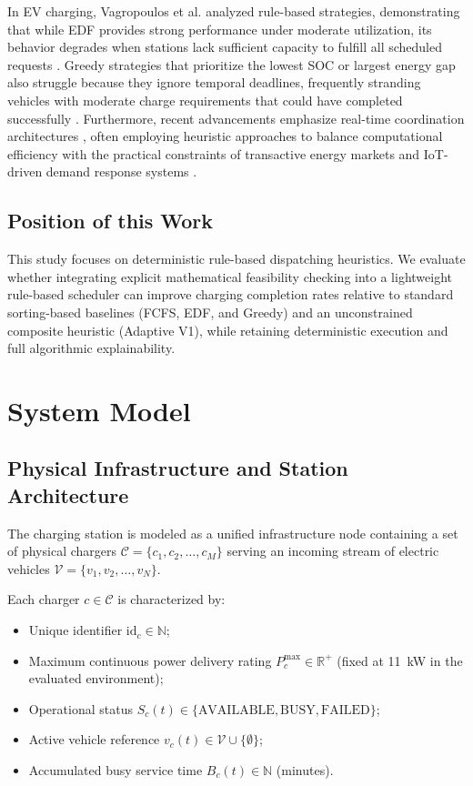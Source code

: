 \documentclass[conference]{IEEEtran}
\begin{document}
In EV charging, Vagropoulos et al. \cite{vagropoulos2019comparison} analyzed rule-based strategies, demonstrating that while EDF provides strong performance under moderate utilization, its behavior degrades when stations lack sufficient capacity to fulfill all scheduled requests \cite{chen2012deadline, jin2020optimal, hao2022laxity}. Greedy strategies that prioritize the lowest SOC or largest energy gap also struggle because they ignore temporal deadlines, frequently stranding vehicles with moderate charge requirements that could have completed successfully \cite{alonso2014optimal, yao2014multi}. Furthermore, recent advancements emphasize real-time coordination architectures \cite{tian2016realtime, tan2015realtime, guo2014rapidcharging}, often employing heuristic approaches to balance computational efficiency with the practical constraints of transactive energy markets and IoT-driven demand response systems \cite{savari2019internet, liu2018transactive, yao2016a, kang2015centralized}.

\subsection{Position of this Work}
This study focuses on deterministic rule-based dispatching heuristics. We evaluate whether integrating explicit mathematical feasibility checking into a lightweight rule-based scheduler can improve charging completion rates relative to standard sorting-based baselines (FCFS, EDF, and Greedy) and an unconstrained composite heuristic (Adaptive V1), while retaining deterministic execution and full algorithmic explainability.

\section{System Model}
\label{sec:model}

\subsection{Physical Infrastructure and Station Architecture}
The charging station is modeled as a unified infrastructure node containing a set of physical chargers $\mathcal{C} = \{c_1, c_2, \dots, c_M\}$ serving an incoming stream of electric vehicles $\mathcal{V} = \{v_1, v_2, \dots, v_N\}$.

Each charger $c \in \mathcal{C}$ is characterized by:
\begin{itemize}
    \item Unique identifier $\mathrm{id}_c \in \mathbb{N}$;
    \item Maximum continuous power delivery rating $P_c^{\max} \in \mathbb{R}^+$ (fixed at 11~kW in the evaluated environment);
    \item Operational status $S_c(t) \in \{\text{AVAILABLE}, \text{BUSY}, \text{FAILED}\}$;
    \item Active vehicle reference $v_c(t) \in \mathcal{V} \cup \{\emptyset\}$;
    \item Accumulated busy service time $B_c(t) \in \mathbb{N}$ (minutes).
\end{itemize}
\end{document}
